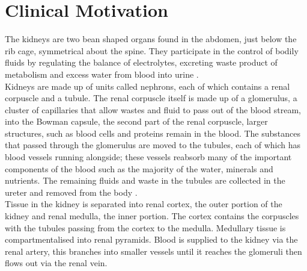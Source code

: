 \section{Clinical Motivation}
\label{sec:intro_clinical}

The kidneys are two bean shaped organs found in the abdomen, just below the rib cage, symmetrical about the spine. They participate in the control of bodily fluids by regulating the balance of electrolytes, excreting waste product of metabolism and excess water from blood into urine \cite{lote_principles_2012}. \\

Kidneys are made up of units called nephrons, each of which contains a renal corpuscle and a tubule. The renal corpuscle itself is made up of a glomerulus, a cluster of capillaries that allow wastes and fluid to pass out of the blood stream, into the Bowman capsule, the second part of the renal corpuscle, larger structures, such as blood cells and proteins remain in the blood. The substances that passed through the glomerulus are moved to the tubules, each of which has blood vessels running alongside; these vessels reabsorb many of the important components of the blood such as the majority of the water, minerals and nutrients. The remaining fluids and waste in the tubules are collected in the ureter and removed from the body \cite{hall_guyton_2015}.\\

Tissue in the kidney is separated into renal cortex, the outer portion of the kidney and renal medulla, the inner portion. The cortex contains the corpuscles with the tubules passing from the cortex to the medulla. Medullary tissue is compartmentalised into renal pyramids. Blood is supplied to the kidney via the renal artery, this branches into smaller vessels until it reaches the glomeruli then flows out via the renal vein.\\

